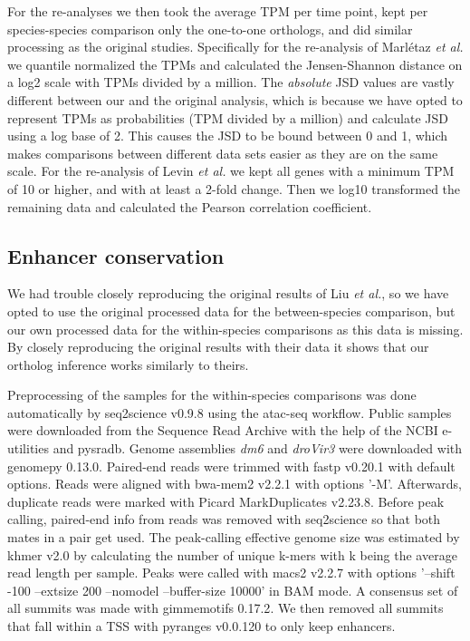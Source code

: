For the re-analyses we then took the average TPM per time point, kept per species-species comparison only the one-to-one orthologs, and did similar processing as the original studies. Specifically for the re-analysis of Marl\'etaz \textit{et al.} we quantile normalized\cite{qnorm} the TPMs and calculated the Jensen-Shannon distance on a log2 scale with TPMs divided by a million. The \textit{absolute} JSD values are vastly different between our and the original analysis, which is because we have opted to represent TPMs as probabilities (TPM divided by a million) and calculate JSD using a log base of 2. This causes the JSD to be bound between 0 and 1, which makes comparisons between different data sets easier as they are on the same scale. For the re-analysis of Levin \textit{et al.} we kept all genes with a minimum TPM of 10 or higher, and with at least a 2-fold change. Then we log10 transformed the remaining data and calculated the Pearson correlation coefficient.

\subsection{Enhancer conservation}

We had trouble closely reproducing the original results of Liu \textit{et al.}, so we have opted to use the original processed data for the between-species comparison, but our own processed data for the within-species comparisons as this data is missing. By closely reproducing the original results with their data it shows that our ortholog inference works similarly to theirs.

Preprocessing of the samples for the within-species comparisons was done automatically by seq2science v0.9.8\cite{seq2science} using the atac-seq workflow. Public samples were downloaded from the Sequence Read Archive with the help of the NCBI e-utilities and pysradb\cite{Choudhary2019}. Genome assemblies \textit{dm6} and \textit{droVir3} were downloaded with genomepy 0.13.0\cite{Frlich2023}. Paired-end reads were trimmed with fastp v0.20.1\cite{Chen2018} with default options. Reads were aligned with bwa-mem2 v2.2.1\cite{bwamem2} with options '-M'. Afterwards, duplicate reads were marked with Picard MarkDuplicates v2.23.8\cite{picard}. Before peak calling, paired-end info from reads was removed with seq2science so that both mates in a pair get used. The peak-calling effective genome size was estimated by khmer v2.0\cite{Crusoe2015} by calculating the number of unique k-mers with k being the average read length per sample. Peaks were called with macs2 v2.2.7\cite{Zhang2008} with options '--shift -100 --extsize 200 --nomodel --buffer-size 10000' in BAM mode. A consensus set of all summits was made with gimmemotifs 0.17.2\cite{gimmemotifs}. We then removed all summits that fall within a TSS with pyranges v0.0.120\cite{Stovner2019} to only keep enhancers.

